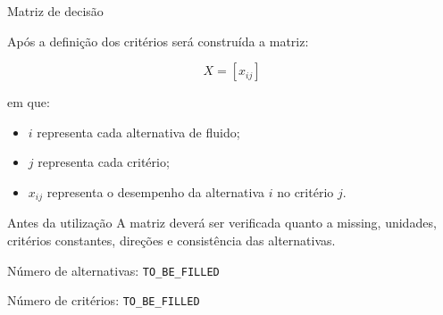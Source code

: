 \begin{frame}{Matriz de decisão}

    Após a definição dos critérios será construída a matriz:

    \[
    X=[x_{ij}]
    \]

    em que:

    \begin{itemize}
        \item \(i\) representa cada alternativa de fluido;
        \item \(j\) representa cada critério;
        \item \(x_{ij}\) representa o desempenho da alternativa
              \(i\) no critério \(j\).
    \end{itemize}

    \vspace{0.3cm}

    \begin{block}{Antes da utilização}
        A matriz deverá ser verificada quanto a missing, unidades,
        critérios constantes, direções e consistência das alternativas.
    \end{block}

    \vspace{0.2cm}

    \begin{center}
        Número de alternativas:
        \texttt{TO\_BE\_FILLED}

        \vspace{0.1cm}

        Número de critérios:
        \texttt{TO\_BE\_FILLED}
    \end{center}

\end{frame}



